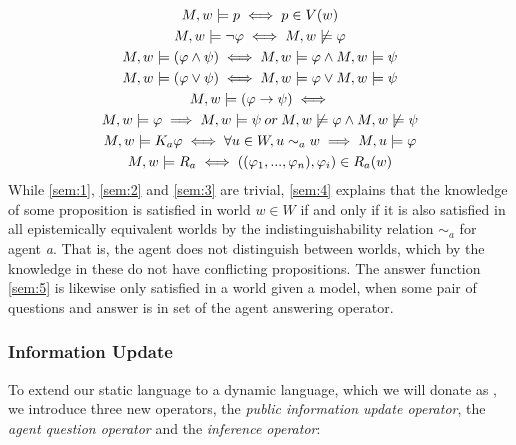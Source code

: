 \begin{gather}
    M, w |= p \iff p \in V(w) \label{sem:1}\\
    M, w |= \neg\varphi \iff M, w \not\models \varphi \label{sem:2}\\
    M, w |= (\varphi \land \psi) \iff M, w |= \varphi \land M, w |= \psi \label{sem:3}\\
    M, w |= (\varphi \lor \psi) \iff M, w |= \varphi \lor M, w |= \psi\\
    M, w |= \nonumber (\varphi \rightarrow \psi) \iff \\ M, w |= \varphi \implies M, w |= \psi \: or \: M, w \not\models \varphi \land M, w \not\models \psi\\
    M, w |= K_a\varphi \iff \forall u\in W, u \sim_{a} w \implies M, u |= \varphi \label{sem:4} \\
    M, w |= R_a \iff ((\varphi_1,...,\varphi_n), \varphi_i) \in R_a(w) \label{sem:5}
\end{gather}
While \cref{sem:1}, \cref{sem:2} and \cref{sem:3} are trivial, \cref{sem:4} explains that the knowledge of some proposition \proposition is satisfied in world $w \in W$ if and only if it is also satisfied in all epistemically equivalent worlds by the indistinguishability relation $\sim_a$ for agent \textit{a}. That is, the agent does not distinguish between worlds, which by the knowledge in these do not have conflicting propositions. The answer function \cref{sem:5} is likewise only satisfied in a world given a model, when some pair of questions and answer is in set of the agent answering operator.

\subsubsection*{Information Update}
To extend our static language \staticlang\: to a dynamic language, which we will donate as \dynlang, we introduce three new operators, the \textit{public information update operator}, the \textit{agent question operator} and the \textit{inference operator}:

